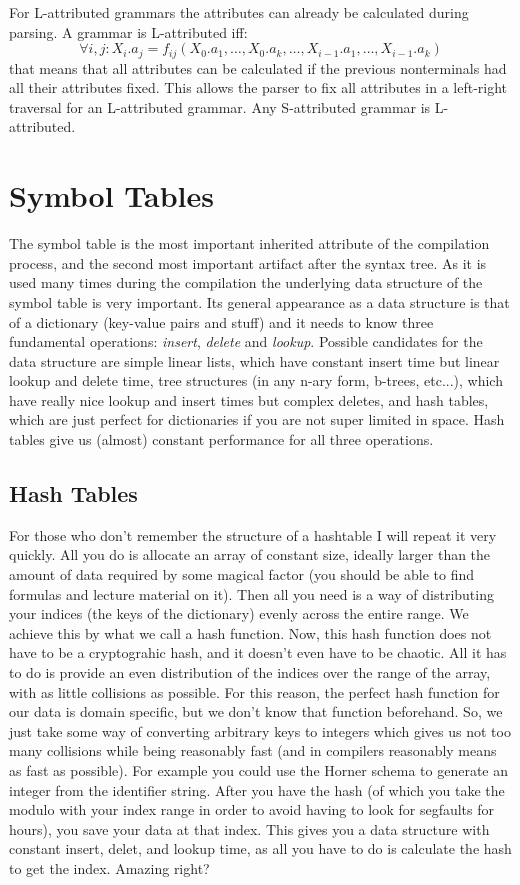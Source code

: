 \documentclass{article}
\begin{document}
For L-attributed grammars the attributes can already be calculated during parsing.
A grammar is L-attributed iff:
\begin{equation}
	\forall i,j: X_i.a_j = f_{ij}(X_0.a_1, \dots, X_0.a_k, \dots, X_{i-1}.a_1, \dots, X_{i-1}.a_k)
\end{equation}
that means that all attributes can be calculated if the previous nonterminals had all their attributes fixed.
This allows the parser to fix all attributes in a left-right traversal for an L-attributed grammar.
Any S-attributed grammar is L-attributed.

\section{Symbol Tables}
The symbol table is the most important inherited attribute of the compilation process, and the second most important artifact after the syntax tree.
As it is used many times during the compilation the underlying data structure of the symbol table is very important.
Its general appearance as a data structure is that of a dictionary (key-value pairs and stuff) and it needs to know three fundamental operations: \emph{insert}, \emph{delete} and \emph{lookup}.
Possible candidates for the data structure are simple linear lists, which have constant insert time but linear lookup and delete time, tree structures (in any n-ary form, b-trees, etc...), which have really nice lookup and insert times but complex deletes, and hash tables, which are just perfect for dictionaries if you are not super limited in space.
Hash tables give us (almost) constant performance for all three operations.

\subsection{Hash Tables}
For those who don't remember the structure of a hashtable I will repeat it very quickly.
All you do is allocate an array of constant size, ideally larger than the amount of data required by some magical factor (you should be able to find formulas and lecture material on it).
Then all you need is a way of distributing your indices (the keys of the dictionary) evenly across the entire range.
We achieve this by what we call a hash function.
Now, this hash function does not have to be a cryptograhic hash, and it doesn't even have to be chaotic.
All it has to do is provide an even distribution of the indices over the range of the array, with as little collisions as possible.
For this reason, the perfect hash function for our data is domain specific, but we don't know that function beforehand.
So, we just take some way of converting arbitrary keys to integers which gives us not too many collisions while being reasonably fast (and in compilers reasonably means as fast as possible).
For example you could use the Horner schema to generate an integer from the identifier string.
After you have the hash (of which you take the modulo with your index range in order to avoid having to look for segfaults for hours), you save your data at that index.
This gives you a data structure with constant insert, delet, and lookup time, as all you have to do is calculate the hash to get the index.
Amazing right?
\end{document}
